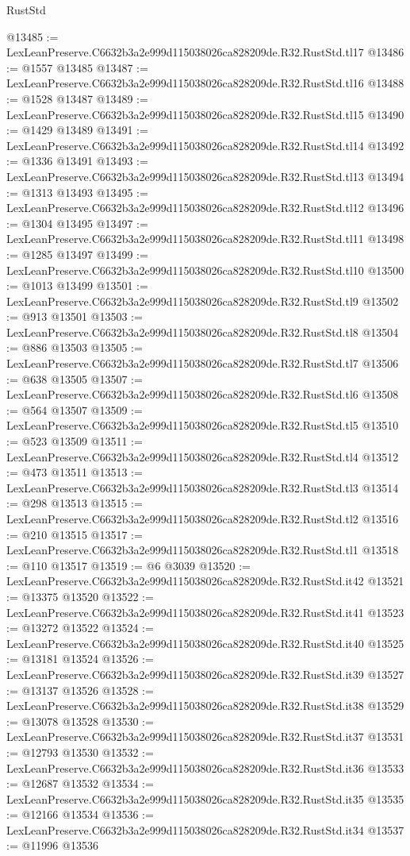 \begin{lexlean}{RustStd}
\begin{coremodule}
@13485 := LexLeanPreserve.C6632b3a2e999d115038026ca828209de.R32.RustStd.tl17
@13486 := @1557 @13485
@13487 := LexLeanPreserve.C6632b3a2e999d115038026ca828209de.R32.RustStd.tl16
@13488 := @1528 @13487
@13489 := LexLeanPreserve.C6632b3a2e999d115038026ca828209de.R32.RustStd.tl15
@13490 := @1429 @13489
@13491 := LexLeanPreserve.C6632b3a2e999d115038026ca828209de.R32.RustStd.tl14
@13492 := @1336 @13491
@13493 := LexLeanPreserve.C6632b3a2e999d115038026ca828209de.R32.RustStd.tl13
@13494 := @1313 @13493
@13495 := LexLeanPreserve.C6632b3a2e999d115038026ca828209de.R32.RustStd.tl12
@13496 := @1304 @13495
@13497 := LexLeanPreserve.C6632b3a2e999d115038026ca828209de.R32.RustStd.tl11
@13498 := @1285 @13497
@13499 := LexLeanPreserve.C6632b3a2e999d115038026ca828209de.R32.RustStd.tl10
@13500 := @1013 @13499
@13501 := LexLeanPreserve.C6632b3a2e999d115038026ca828209de.R32.RustStd.tl9
@13502 := @913 @13501
@13503 := LexLeanPreserve.C6632b3a2e999d115038026ca828209de.R32.RustStd.tl8
@13504 := @886 @13503
@13505 := LexLeanPreserve.C6632b3a2e999d115038026ca828209de.R32.RustStd.tl7
@13506 := @638 @13505
@13507 := LexLeanPreserve.C6632b3a2e999d115038026ca828209de.R32.RustStd.tl6
@13508 := @564 @13507
@13509 := LexLeanPreserve.C6632b3a2e999d115038026ca828209de.R32.RustStd.tl5
@13510 := @523 @13509
@13511 := LexLeanPreserve.C6632b3a2e999d115038026ca828209de.R32.RustStd.tl4
@13512 := @473 @13511
@13513 := LexLeanPreserve.C6632b3a2e999d115038026ca828209de.R32.RustStd.tl3
@13514 := @298 @13513
@13515 := LexLeanPreserve.C6632b3a2e999d115038026ca828209de.R32.RustStd.tl2
@13516 := @210 @13515
@13517 := LexLeanPreserve.C6632b3a2e999d115038026ca828209de.R32.RustStd.tl1
@13518 := @110 @13517
@13519 := @6 @3039
@13520 := LexLeanPreserve.C6632b3a2e999d115038026ca828209de.R32.RustStd.it42
@13521 := @13375 @13520
@13522 := LexLeanPreserve.C6632b3a2e999d115038026ca828209de.R32.RustStd.it41
@13523 := @13272 @13522
@13524 := LexLeanPreserve.C6632b3a2e999d115038026ca828209de.R32.RustStd.it40
@13525 := @13181 @13524
@13526 := LexLeanPreserve.C6632b3a2e999d115038026ca828209de.R32.RustStd.it39
@13527 := @13137 @13526
@13528 := LexLeanPreserve.C6632b3a2e999d115038026ca828209de.R32.RustStd.it38
@13529 := @13078 @13528
@13530 := LexLeanPreserve.C6632b3a2e999d115038026ca828209de.R32.RustStd.it37
@13531 := @12793 @13530
@13532 := LexLeanPreserve.C6632b3a2e999d115038026ca828209de.R32.RustStd.it36
@13533 := @12687 @13532
@13534 := LexLeanPreserve.C6632b3a2e999d115038026ca828209de.R32.RustStd.it35
@13535 := @12166 @13534
@13536 := LexLeanPreserve.C6632b3a2e999d115038026ca828209de.R32.RustStd.it34
@13537 := @11996 @13536

\end{coremodule}
\end{lexlean}
